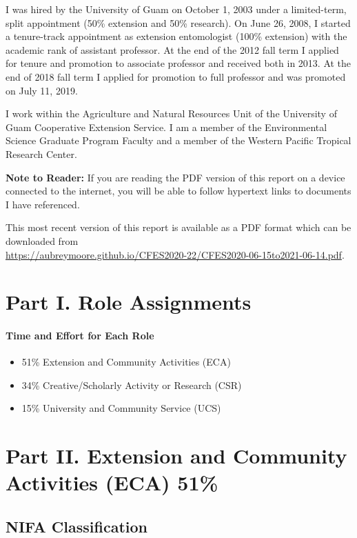 I was hired by the University of Guam on October 1, 2003 under a limited-term,
split appointment (50\% extension and 50\% research). On June 26,
2008, I started a tenure-track appointment as extension entomologist
(100\% extension) with the academic rank of assistant professor. At
the end of the 2012 fall term I applied for tenure and promotion to associate professor and
received both in 2013. At the end of 2018 fall term I applied for promotion to
full professor and was promoted on July 11, 2019. 

I work within the Agriculture and Natural Resources Unit of the University
of Guam Cooperative Extension Service. I am a member of the
Environmental Science Graduate Program Faculty and a member of the Western
Pacific Tropical Research Center. 

\vspace{0.5in}
\textbf{Note to Reader:}
If you are reading the PDF version of this report on a device connected
to the internet, you will be able to follow hypertext links to documents
I have referenced.

This most recent version of this report is available as a PDF format which can be downloaded from\\
{\small \url{https://aubreymoore.github.io/CFES2020-22/CFES2020-06-15to2021-06-14.pdf}.} 


\pagebreak

\section{Part I. Role Assignments}
\paragraph{Time and Effort for Each Role}
\begin{itemize}
	\item 51\% Extension and Community Activities (ECA)
	\item 34\% Creative/Scholarly Activity or Research (CSR)
	\item 15\% University and Community Service (UCS)
\end{itemize}

\section{Part II. Extension and Community Activities (ECA) 51\%}

\subsection{NIFA Classification}

